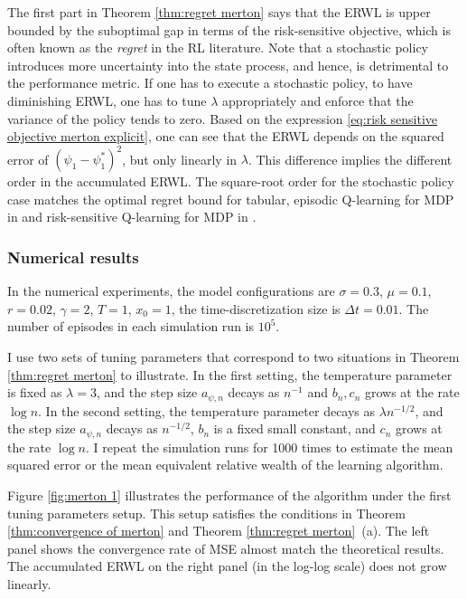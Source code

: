 The first part in Theorem \ref{thm:regret merton} says that the ERWL is upper bounded by the suboptimal gap in terms of the risk-sensitive objective, which is often known as the \textit{regret} in the RL literature. Note that a stochastic policy introduces more uncertainty into the state process, and hence, is detrimental to the performance metric. If one has to execute a stochastic policy, to have diminishing ERWL, one has to tune $\lambda$ appropriately and enforce that the variance of the policy tends to zero. Based on the expression \eqref{eq:risk sensitive objective merton explicit}, one can see that the ERWL depends on the squared error of $(\psi_1 - \psi_1^*)^2$, but only linearly in $\lambda$. This difference implies the different order in the accumulated ERWL. The square-root order for the stochastic policy case matches the optimal regret bound for tabular, episodic Q-learning for MDP in \citet{jin2018q} and risk-sensitive Q-learning for MDP in \citet{fei2020risk}.

\subsubsection{Numerical results}
In the numerical experiments, the model configurations are $\sigma=0.3$, $\mu=0.1$, $r=0.02$, $\gamma=2$, $T=1$, $x_0=1$, the time-discretization size is $\Delta t=0.01$. The number of episodes in each simulation run is $10^5$. 

I use two sets of tuning parameters that correspond to two situations in Theorem \ref{thm:regret merton} to illustrate. In the first setting, the temperature parameter is fixed as $\lambda=3$, and the step size $a_{\psi,n}$ decays as $n^{-1}$ and $b_n,c_n$ grows at the rate $\log n$. In the second setting, the temperature parameter decays as $\lambda n^{-1/2}$, and the step size $a_{\psi,n}$ decays as $n^{-1/2}$, $b_n$ is a fixed small constant, and $c_n$ grows at the rate $\log n$. I repeat the simulation runs for 1000 times to estimate the mean squared error or the mean equivalent relative wealth of the learning algorithm.

Figure \ref{fig:merton 1} illustrates the performance of the algorithm under the first tuning parameters setup. This setup satisfies the conditions in Theorem \ref{thm:convergence of merton} and Theorem \ref{thm:regret merton}~(a). The left panel shows the convergence rate of MSE almost match the theoretical results. The accumulated ERWL on the right panel (in the log-log scale) does not grow linearly. 

